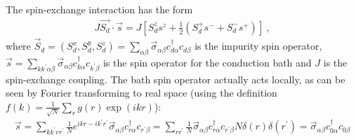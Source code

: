 \documentclass{report}
\numberwithin{equation}{section}
\begin{document}
The spin-exchange interaction has the form
\begin{equation}\begin{aligned}
	J \vec{S_d}\cdot\vec{s} = J \left[S_d^z s^z + \frac{1}{2}\left( S_d^+ s^- + S_d^- s^+ \right) \right] ~,
\end{aligned}\end{equation}
where \(\vec S_d = \left(S_d^x, S_d^y, S_d^z\right) = \sum_{\alpha\beta}\vec \sigma_{\alpha\beta}c^\dagger_{d\alpha}c_{d\beta}\) is the impurity spin operator, \(\vec s = \sum_{kk^\prime\alpha\beta}\vec \sigma_{\alpha\beta}c^\dagger_{k\alpha}c_{k^\prime\beta}\) is the spin operator for the conduction bath and \(J\) is the spin-exchange coupling. The bath spin operator actually acts locally, as can be seen by Fourier transforming to real space (using the definition \(f(k) = \frac{1}{\sqrt N}\sum_r g(r)\exp(ikr)\)):
\begin{equation}\begin{aligned}
	\vec s = \sum_{k k^\prime r r^\prime} \frac{1}{N} e^{ikr - ik^\prime r^\prime} \vec \sigma_{\alpha\beta} c^\dagger_{r\alpha} c_{r^\prime\beta} = \sum_{rr^\prime}\frac{1}{N}\vec \sigma_{\alpha\beta} c^\dagger_{r\alpha} c_{r^\prime\beta} N \delta(r)\delta(r^\prime) = \vec \sigma_{\alpha\beta} c^\dagger_{0\alpha} c_{0\beta}
\end{aligned}\end{equation}
\end{document}
